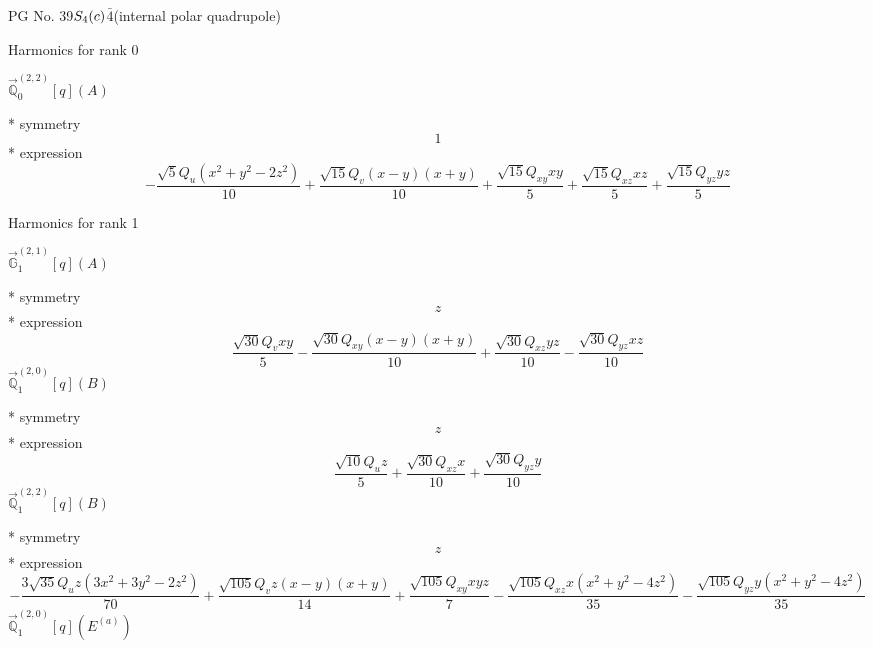 \documentclass[fleqn,8pt]{jsarticle}
\begin{document}
\setcounter{MaxMatrixCols}{32}

\renewcommand{\tablename}{Table~}
\renewcommand{\figurename}{Figure~}
\begin{center}
\LARGE
PG No. 39\quad$S_{\rm 4}(c)$\quad$\bar{4}$\quad[ tetragonal ] (internal polar quadrupole)
\end{center}

\noindent * Harmonics for rank 0

\noindent\quad $\vec{\mathbb{Q}}_{0}^{(2,2)}[q](A)$

\noindent\quad ** symmetry
\begin{dmath*}
1
\end{dmath*}
\noindent\quad ** expression
\begin{dmath*}
- \frac{\sqrt{5} Q_{u} \left(x^{2} + y^{2} - 2 z^{2}\right)}{10} + \frac{\sqrt{15} Q_{v} \left(x - y\right) \left(x + y\right)}{10} + \frac{\sqrt{15} Q_{xy} x y}{5} + \frac{\sqrt{15} Q_{xz} x z}{5} + \frac{\sqrt{15} Q_{yz} y z}{5}
\end{dmath*}

\noindent * Harmonics for rank 1

\noindent\quad $\vec{\mathbb{G}}_{1}^{(2,1)}[q](A)$

\noindent\quad ** symmetry
\begin{dmath*}
z
\end{dmath*}
\noindent\quad ** expression
\begin{dmath*}
\frac{\sqrt{30} Q_{v} x y}{5} - \frac{\sqrt{30} Q_{xy} \left(x - y\right) \left(x + y\right)}{10} + \frac{\sqrt{30} Q_{xz} y z}{10} - \frac{\sqrt{30} Q_{yz} x z}{10}
\end{dmath*}
\noindent\quad $\vec{\mathbb{Q}}_{1}^{(2,0)}[q](B)$

\noindent\quad ** symmetry
\begin{dmath*}
z
\end{dmath*}
\noindent\quad ** expression
\begin{dmath*}
\frac{\sqrt{10} Q_{u} z}{5} + \frac{\sqrt{30} Q_{xz} x}{10} + \frac{\sqrt{30} Q_{yz} y}{10}
\end{dmath*}
\noindent\quad $\vec{\mathbb{Q}}_{1}^{(2,2)}[q](B)$

\noindent\quad ** symmetry
\begin{dmath*}
z
\end{dmath*}
\noindent\quad ** expression
\begin{dmath*}
- \frac{3 \sqrt{35} Q_{u} z \left(3 x^{2} + 3 y^{2} - 2 z^{2}\right)}{70} + \frac{\sqrt{105} Q_{v} z \left(x - y\right) \left(x + y\right)}{14} + \frac{\sqrt{105} Q_{xy} x y z}{7} - \frac{\sqrt{105} Q_{xz} x \left(x^{2} + y^{2} - 4 z^{2}\right)}{35} - \frac{\sqrt{105} Q_{yz} y \left(x^{2} + y^{2} - 4 z^{2}\right)}{35}
\end{dmath*}
\noindent\quad $\vec{\mathbb{Q}}_{1}^{(2,0)}[q](E^{(a)})$
\end{document}
